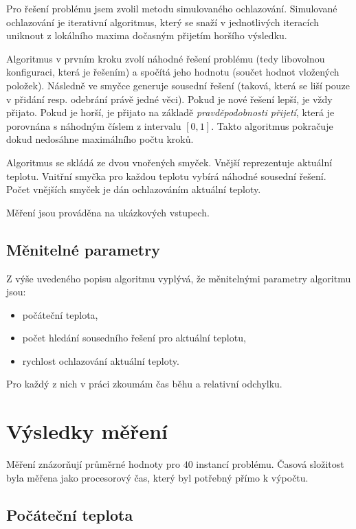 \documentclass[czech]{article}
\begin{document}
Pro řešení problému jsem zvolil metodu simulovaného ochlazování.
Simulované ochlazování je iterativní algoritmus, který se snaží v jednotlivých iteracích uniknout z lokálního maxima dočasným přijetím horšího výsledku.

Algoritmus v prvním kroku zvolí náhodné řešení problému (tedy libovolnou konfiguraci, která je řešením) a spočítá jeho hodnotu (součet hodnot vložených položek).
Následně ve smyčce generuje sousední řešení (taková, která se liší pouze v přidání resp. odebrání právě jedné věci).
Pokud je nové řešení lepší, je vždy přijato.
Pokud je horší, je přijato na základě \textit{pravděpodobnosti přijetí}, která je porovnána s náhodným číslem z intervalu $[0, 1]$.
Takto algoritmus pokračuje dokud nedosáhne maximálního počtu kroků.

Algoritmus se skládá ze dvou vnořených smyček.
Vnější reprezentuje aktuální teplotu.
Vnitřní smyčka pro každou teplotu vybírá náhodné sousední řešení.
Počet vnějších smyček je dán ochlazováním aktuální teploty.

Měření jsou prováděna na ukázkových vstupech.

\subsection*{Měnitelné parametry}

Z výše uvedeného popisu algoritmu vyplývá, že měnitelnými parametry algoritmu jsou:

\begin{itemize}
    \item počáteční teplota,
    \item počet hledání sousedního řešení pro aktuální teplotu,
    \item rychlost ochlazování aktuální teploty.
\end{itemize}

Pro každý z nich v práci zkoumám čas běhu a relativní odchylku.

\section{Výsledky měření}

Měření znázorňují průměrné hodnoty pro $40$ instancí problému.
Časová složitost byla měřena jako procesorový čas, který byl potřebný přímo k výpočtu.

\subsection{Počáteční teplota}
\end{document}
